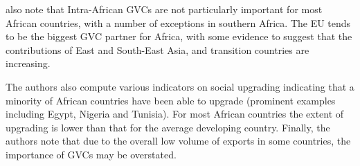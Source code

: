 \documentclass[a4paper]{article}
\begin{document}
\citet{foster2015global} also note that Intra-African GVCs are not particularly important for most African countries, with a number of exceptions in southern Africa. The EU tends to be the biggest GVC partner for Africa, with some evidence to suggest that the contributions of East and South-East Asia, and transition countries are increasing. \newline



The authors also compute various indicators on social upgrading indicating that a minority of African countries have been able to upgrade (prominent examples including Egypt, Nigeria and Tunisia). For most African countries the extent of upgrading is lower than that for the average developing country. %
Finally, the authors note that due to the overall low volume of exports in some countries, the importance  of GVCs may be overstated. \newline



\end{document}
